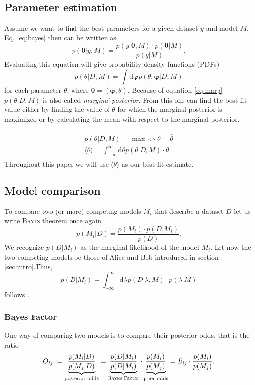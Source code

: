 \documentclass[%
 reprint,
 amsmath,amssymb,
 aps,
]{revtex4-1}
\begin{document}
\subsection{Parameter estimation}
\noindent Assume we want to find the best parameters for a given dataset $y$ and model $M$. Eq. \eqref{eq:bayes} then can be written as
\begin{equation}
	p(\boldsymbol{\theta} | y,M) = \frac{p(y|\boldsymbol{\theta},M)\cdot p(\boldsymbol{\theta}|M)}{p(y|M)}.
\end{equation}
Evaluating this equation will give probability density functions (PDFs) 
\begin{equation}
\label{eq:marp}
	p(\theta|D,M)=\int \text{d}\boldsymbol{\varphi}p(\theta,\boldsymbol{\varphi}|D,M)
\end{equation}
 for each parameter $\theta$, where $\boldsymbol{\theta}=(\boldsymbol{\varphi},\theta)$.  Because of equation \eqref{eq:marp} $p(\theta|D,M)$ is also called \emph{marginal posterior}. From this one can find the best fit value either by finding the value of $\theta$ for which the marginal posterior is maximized or by calculating the mean with respect to the marginal posterior.

\begin{align}
	\begin{split}
		p(\theta|D,M)=\max \Leftrightarrow \theta=\hat{\theta}\\
		\langle\theta\rangle=\int_{-\infty}^{\infty}\text{d}\theta  p(\theta|D,M)\cdot\theta
	\end{split}
\end{align}
Throughout this paper we will use $\langle\theta\rangle$ as our best fit estimate. \cite{sivia}

\subsection{Model comparison}\label{sec:Model_comparison}
\noindent To compare two (or more) competing models $M_i$ that describe a dataset $D$ let us write \textsc{Bayes} theorem once again
\begin{equation}
	p(M_i|D)=\frac{p(M_i)\cdot p(D|M_i)}{p(D)}.
\end{equation}
We recognize $p(D|M_i)$ as the marginal likelihood of the model $M_i$. Let now  the two competing models be those of Alice and Bob introduced in section \eqref{sec:intro}.Thus, $$p(D|M_i)=\int_{-\infty}^{\infty}\text{d}\lambda p(D|\lambda, M)\cdot p(\lambda|M)$$
follows \cite[Chap. 3]{sivia}.
\subsubsection{Bayes Factor}
One way of comparing two models is to compare their posterior odds, that is the ratio \begin{equation}\label{eq:bf}O_{ij}:=\underbrace{\frac{p(M_i|D)}{p(M_j|D)}}_{\text{posterior odds}}=\underbrace{\frac{p(D|M_i)}{p(D|M_i)}}_{\text{\textsc{Bayes} Factor}}\cdot\underbrace{\frac{p(M_i)}{p(M_j)}}_{\text{prior odds}}=B_{ij}\cdot\frac{p(M_i)}{p(M_j)}.\end{equation}
\end{document}
